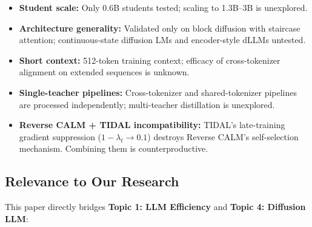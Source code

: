 \documentclass[11pt]{article}
\begin{document}
\begin{itemize}
    \item \textbf{Student scale:} Only 0.6B students tested; scaling to 1.3B--3B is unexplored.
    \item \textbf{Architecture generality:} Validated only on block diffusion with staircase attention; continuous-state diffusion LMs and encoder-style dLLMs untested.
    \item \textbf{Short context:} 512-token training context; efficacy of cross-tokenizer alignment on extended sequences is unknown.
    \item \textbf{Single-teacher pipelines:} Cross-tokenizer and shared-tokenizer pipelines are processed independently; multi-teacher distillation is unexplored.
    \item \textbf{Reverse CALM + TIDAL incompatibility:} TIDAL's late-training gradient suppression ($1 - \lambda_t \to 0.1$) destroys Reverse CALM's self-selection mechanism. Combining them is counterproductive.
\end{itemize}

\subsection{Relevance to Our Research}

This paper directly bridges \textbf{Topic 1: LLM Efficiency} and \textbf{Topic 4: Diffusion LLM}:
\end{document}

